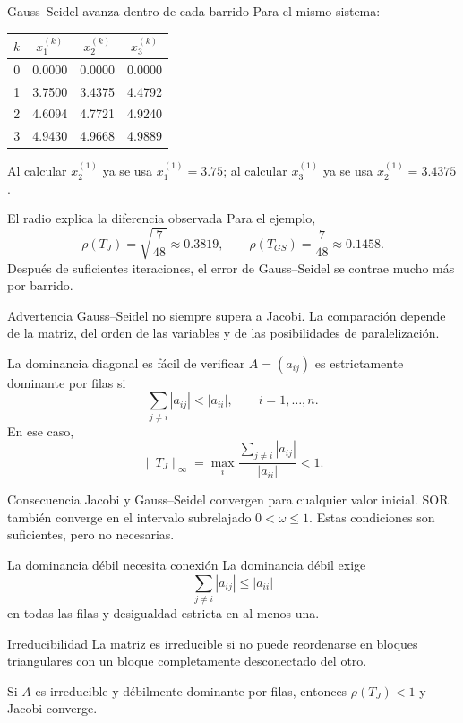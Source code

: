 \documentclass[aspectratio=169,12pt]{beamer}
\begin{document}
\begin{frame}{Gauss--Seidel avanza dentro de cada barrido}
Para el mismo sistema:
\begin{center}
\begin{tabular}{c@{\qquad}ccc}
\toprule
$k$ & $x_1^{(k)}$ & $x_2^{(k)}$ & $x_3^{(k)}$\\
\midrule
0 & 0.0000 & 0.0000 & 0.0000\\
1 & 3.7500 & 3.4375 & 4.4792\\
2 & 4.6094 & 4.7721 & 4.9240\\
3 & 4.9430 & 4.9668 & 4.9889\\
\bottomrule
\end{tabular}
\end{center}
Al calcular $x_2^{(1)}$ ya se usa $x_1^{(1)}=3.75$; al calcular
$x_3^{(1)}$ ya se usa $x_2^{(1)}=3.4375$.
\end{frame}

\begin{frame}{El radio explica la diferencia observada}
Para el ejemplo,
\[
\rho(T_J)=\sqrt{\frac{7}{48}}\approx0.3819,
\qquad
\rho(T_{GS})=\frac{7}{48}\approx0.1458.
\]
Después de suficientes iteraciones, el error de Gauss--Seidel se contrae mucho
más por barrido.
\begin{block}{Advertencia}
Gauss--Seidel no siempre supera a Jacobi. La comparación depende de la matriz,
del orden de las variables y de las posibilidades de paralelización.
\end{block}
\end{frame}

\begin{frame}{La dominancia diagonal es fácil de verificar}
$A=(a_{ij})$ es estrictamente dominante por filas si
\[
\sum_{j\neq i}|a_{ij}|<|a_{ii}|,
\qquad i=1,\ldots,n.
\]
En ese caso,
\[
\|T_J\|_\infty
=\max_i\frac{\sum_{j\neq i}|a_{ij}|}{|a_{ii}|}<1.
\]
\begin{block}{Consecuencia}
Jacobi y Gauss--Seidel convergen para cualquier valor inicial. SOR también
converge en el intervalo subrelajado $0<\omega\leq1$. Estas condiciones son
suficientes, pero no necesarias.
\end{block}
\end{frame}

\begin{frame}{La dominancia débil necesita conexión}
La dominancia débil exige
\[
\sum_{j\neq i}|a_{ij}|\leq|a_{ii}|
\]
en todas las filas y desigualdad estricta en al menos una.
\begin{block}{Irreducibilidad}
La matriz es irreducible si no puede reordenarse en bloques triangulares con
un bloque completamente desconectado del otro.
\end{block}
Si $A$ es irreducible y débilmente dominante por filas, entonces
$\rho(T_J)<1$ y Jacobi converge.
\end{frame}
\end{document}
